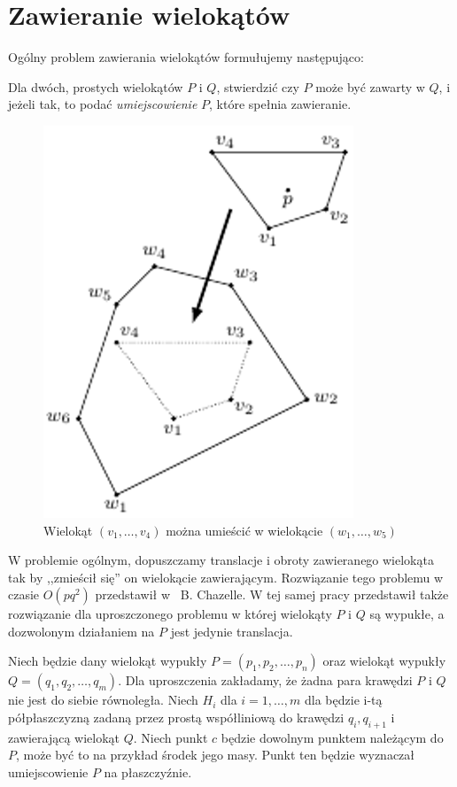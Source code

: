 \chapter{Zawieranie wielokątów}
Ogólny problem zawierania wielokątów formułujemy następująco:

\begin{problem}
  Dla dwóch, prostych wielokątów $P$ i $Q$, stwierdzić czy $P$ może
  być zawarty w $Q$, i jeżeli tak, to podać \emph{umiejscowienie} $P$,
  które spełnia zawieranie.
\end{problem}

\begin{figure}[htb]
  \centering
  \includegraphics[scale=0.5]{img/containment1}
  \caption{Wielokąt $(v_1, \ldots, v_4)$ można umieścić w wielokącie
    $(w_1, \ldots, w_5)$\label{img:containment1}}
\end{figure}

W problemie ogólnym, dopuszczamy translacje i obroty zawieranego
wielokąta tak by ,,zmieścił się'' on wielokącie
zawierającym. Rozwiązanie tego problemu w czasie $O(pq^2)$ przedstawił
w~\cite{Chazelle83} B. Chazelle. W tej samej pracy przedstawił także
rozwiązanie dla uproszczonego problemu w której wielokąty $P$ i $Q$ są
wypukłe, a dozwolonym działaniem na $P$ jest jedynie translacja.

Niech będzie dany wielokąt wypukły $P = (p_1, p_2, \ldots, p_n)$ oraz
wielokąt wypukły $Q = (q_1, q_2, \ldots, q_m)$. Dla uproszczenia
zakładamy, że żadna para krawędzi $P$ i $Q$ nie jest do siebie
równoległa. Niech $H_i$ dla $i = 1, \ldots, m$ dla będzie i-tą
półpłaszczyzną zadaną przez prostą współliniową do krawędzi $q_i,
q_{i+1}$ i zawierającą wielokąt $Q$. Niech punkt $c$ będzie dowolnym
punktem należącym do $P$, może być to na przykład środek jego
masy. Punkt ten będzie wyznaczał umiejscowienie $P$ na płaszczyźnie.


